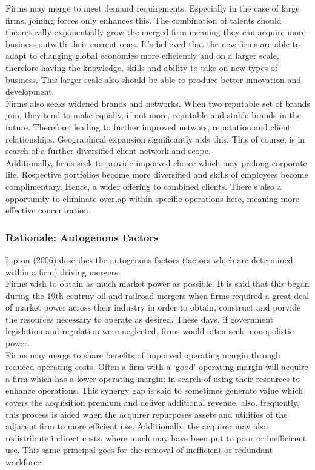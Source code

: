 \documentclass[11pt, english]{article}
\begin{document}
	Firms may merge to meet demand requirements. Especially in the case of large firms, joining forces only enhances this. The combination of talents should theoretically exponentially grow the merged firm meaning they can acquire more business outwith their current ones. It's believed that the new firms are able to adapt to changing global economies more efficiently and on a larger scale, therefore having the knowledge, skills and ability to take on new types of business. This larger scale also should be able to produce better innovation and development.\\

	Firms also seeks widened brands and networks. When two reputable set of brands join, they tend to make equally, if not more, reputable and stable brands in the future. Therefore, leading to further improved networs, reputation and client relationships. Geographical expansion significantly aids this. This of course, is in search of a further diversified client network and scope.\\

	Additionally, firms seek to provide imporved choice which may prolong corporate life. Respective portfolios become more diversified and skills of employees become complimentary. Hence, a wider offering to combined clients. There's also a opportunity to eliminate overlap within specific operations here, meaning more effective concentration.

		\subsubsection*{Rationale: Autogenous Factors}

	Lipton (2006) describes the autogenous factors (factors which are determined within a firm) driving mergers.\\

	Firms wish to obtain as much market power as possible. It is said that this began during the 19$\mathrm{th}$ centruy oil and railroad mergers when firms required a great deal of market power across their industry in order to obtain, construct and porvide the resources necessary to operate as desired. These days, if government legislation and regulation were neglected, firms would often seek monopolistic power.\\

	Firms may merge to share benefits of imporved operating margin through reduced operating costs. Often a firm with a `good' operating margin will acquire a firm which has a lower operating margin; in search of using their resources to enhance operations. This synergy gap is said to sometimes generate value which covers the acquisition premium and deliver additional revenue, also. frequently, this process is aided when the acquirer repurposes assets and utilities of the adjacent firm to more efficient use. Additionally, the acquirer may also redistribute indirect costs, where much may have been put to poor or inefficicent use. This same principal goes for the removal of inefficient or redundant workforce.\\
\end{document}
